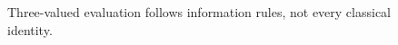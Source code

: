 \begin{figure}[H]
\centering
{}
\caption{Three-valued evaluation follows information rules, not every classical identity.}\label{fig:teach-M03-05}
\end{figure}
